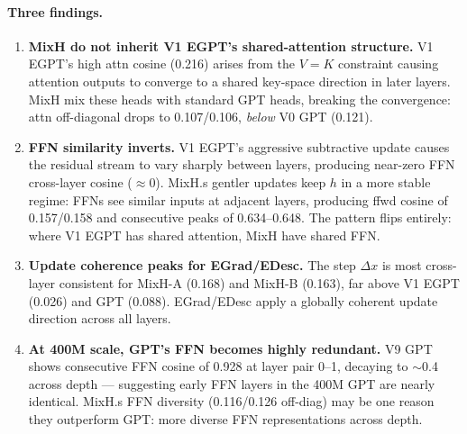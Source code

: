 \paragraph{Three findings.}
\begin{enumerate}
  \item \textbf{MixH do not inherit V1 EGPT's shared-attention structure.}
    V1 EGPT's high attn cosine (0.216) arises from the $V{=}K$ constraint causing
    attention outputs to converge to a shared key-space direction in later layers.
    MixH mix these heads with standard GPT heads, breaking the convergence:
    attn off-diagonal drops to 0.107/0.106, \emph{below} V0 GPT (0.121).

  \item \textbf{FFN similarity inverts.}
    V1 EGPT's aggressive subtractive update causes the residual stream to vary sharply
    between layers, producing near-zero FFN cross-layer cosine ($\approx$0).
    MixH.s gentler updates keep $h$ in a more stable regime: FFNs see similar
    inputs at adjacent layers, producing ffwd cosine of 0.157/0.158 and consecutive
    peaks of 0.634--0.648.  The pattern flips entirely: where V1 EGPT has shared
    attention, MixH have shared FFN.

  \item \textbf{Update coherence peaks for EGrad/EDesc.}
    The step $\Delta x$ is most cross-layer consistent for MixH-A (0.168) and
    MixH-B (0.163), far above V1 EGPT (0.026) and GPT (0.088).
    EGrad/EDesc apply a globally coherent update direction across all layers.

  \item \textbf{At 400M scale, GPT's FFN becomes highly redundant.}
    V9 GPT shows consecutive FFN cosine of 0.928 at layer pair 0--1, decaying to
    $\sim$0.4 across depth --- suggesting early FFN layers in the 400M GPT are nearly
    identical.  MixH.s FFN diversity (0.116/0.126 off-diag) may be one reason
    they outperform GPT: more diverse FFN representations across depth.
\end{enumerate}

